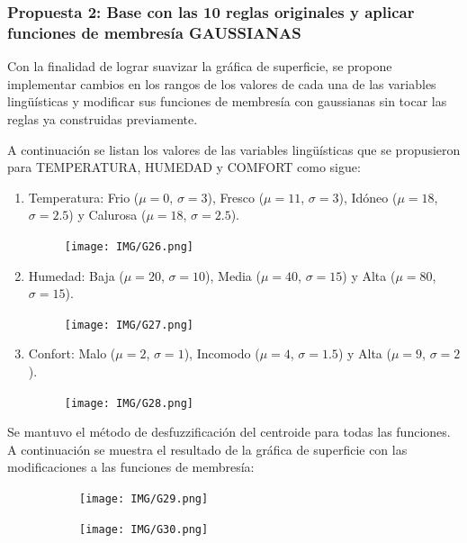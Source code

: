 \documentclass[11pt, letterpaper]{article}
\begin{document}
\newpage

\subsubsection{Propuesta 2: Base con las 10 reglas originales y aplicar funciones de membresía GAUSSIANAS}

Con la finalidad de lograr suavizar la gráfica de superficie, se propone implementar cambios en los rangos de los valores de cada una de las variables lingüísticas y modificar sus funciones de membresía con gaussianas sin tocar las reglas ya construidas previamente.

A continuación se listan los valores de las variables lingüísticas que se propusieron para TEMPERATURA, HUMEDAD y COMFORT como sigue:


\begin{enumerate}
	\item Temperatura: Frio ($\mu = 0$, $\sigma = 3$), Fresco ($\mu = 11$, $\sigma = 3$), Idóneo ($\mu = 18$, $\sigma = 2.5$) y Calurosa ($\mu = 18$, $\sigma = 2.5$).
	\begin{figure}[h]
		\centering
		\texttt{[image: IMG/G26.png]}
	\end{figure}
	
	\item Humedad: Baja ($\mu = 20$, $\sigma = 10$), Media ($\mu = 40$, $\sigma = 15$) y Alta ($\mu = 80$, $\sigma = 15$).
	\begin{figure}[h]
		\centering
		\texttt{[image: IMG/G27.png]}
	\end{figure}
	\newpage
	\item Confort: Malo ($\mu = 2$, $\sigma = 1$), Incomodo ($\mu = 4$, $\sigma = 1.5$) y Alta ($\mu = 9$, $\sigma = 2$).
	\begin{figure}[h]
		\centering
		\texttt{[image: IMG/G28.png]}
	\end{figure}
\end{enumerate}

Se mantuvo el método de desfuzzificación del centroide para todas las funciones.\\

A continuación se muestra el resultado de la gráfica de superficie con las modificaciones a las funciones de membresía: \\


\begin{figure}[h]
	\centering
	\begin{subfigure}{0.42\textwidth} %
		\centering
		\texttt{[image: IMG/G29.png]}
		\label{fig:G21}
	\end{subfigure}
	\hfill
	\begin{subfigure}{0.42\textwidth} %
		\centering
		\texttt{[image: IMG/G30.png]}
		\label{fig:G22}
	\end{subfigure}
	\label{fig:comparacion3}
\end{figure}
\end{document}
